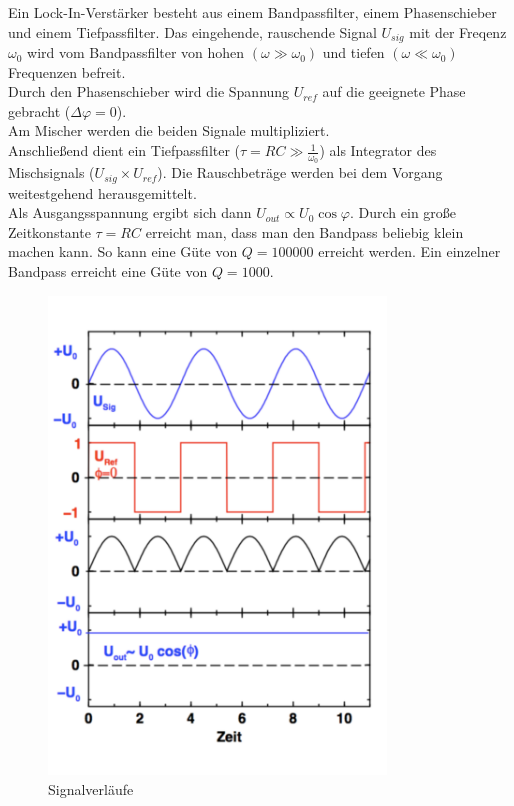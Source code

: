 Ein Lock-In-Verstärker besteht aus einem Bandpassfilter, einem Phasenschieber
und einem Tiefpassfilter. Das eingehende, rauschende Signal $U_{sig}$ mit der Freqenz
$\omega_0$ wird vom Bandpassfilter
von hohen $(\omega \gg \omega_0)$ und tiefen $(\omega \ll \omega_0)$ Frequenzen befreit.
\\Durch den Phasenschieber wird die Spannung $U_{ref}$ auf die geeignete Phase gebracht ($\Delta\varphi=0$).
\\Am Mischer werden die beiden Signale multipliziert.
\\Anschließend dient ein Tiefpassfilter ($\tau = RC \gg \frac{1}{\omega_0}$) als Integrator des Mischsignals ($U_{sig}\times U_{ref}$).
Die Rauschbeträge werden bei dem Vorgang weitestgehend herausgemittelt.
\\Als Ausgangsspannung ergibt sich dann $U_{out}\propto U_0 \cos{\varphi}$.
Durch ein große Zeitkonstante $\tau = RC$ erreicht man, dass man den Bandpass beliebig klein machen kann.
So kann eine Güte von $Q = 100000$ erreicht werden. Ein einzelner Bandpass erreicht eine Güte von $Q = 1000$.
  \begin{figure}[h!]
    \centering
    \includegraphics[width=0.8\textwidth]{Spannungen.pdf}
    \caption{Signalverläufe \cite{1}}
    \label{fig:sig}
  \end{figure}
